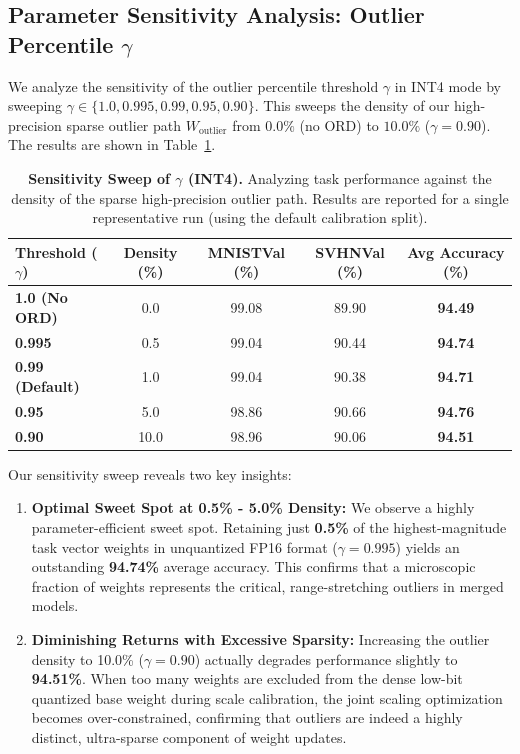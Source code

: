 \subsection{Parameter Sensitivity Analysis: Outlier Percentile $\gamma$}
We analyze the sensitivity of the outlier percentile threshold $\gamma$ in INT4 mode by sweeping $\gamma \in \{1.0, 0.995, 0.99, 0.95, 0.90\}$. This sweeps the density of our high-precision sparse outlier path $W_{\text{outlier}}$ from $0.0\%$ (no ORD) to $10.0\%$ ($\gamma = 0.90$). The results are shown in Table~\ref{tab:sweep_results}.

\begin{table}[h]
\caption{\textbf{Sensitivity Sweep of $\gamma$ (INT4).} Analyzing task performance against the density of the sparse high-precision outlier path. Results are reported for a single representative run (using the default calibration split).}
\label{tab:sweep_results}
\vskip 0.15in
\begin{center}
\begin{small}
\begin{sc}
\begin{tabular}{lcccc}
\toprule
Threshold ($\gamma$) & Density (\%) & MNISTVal (\%) & SVHNVal (\%) & Avg Accuracy (\%) \\
\midrule
\textbf{1.0 (No ORD)} & 0.0 & 99.08 & 89.90 & \textbf{94.49} \\
\textbf{0.995} & 0.5 & 99.04 & 90.44 & \textbf{94.74} \\
\textbf{0.99 (Default)} & 1.0 & 99.04 & 90.38 & \textbf{94.71} \\
\textbf{0.95} & 5.0 & 98.86 & 90.66 & \textbf{94.76} \\
\textbf{0.90} & 10.0 & 98.96 & 90.06 & \textbf{94.51} \\
\bottomrule
\end{tabular}
\end{sc}
\end{small}
\end{center}
\vskip -0.1in
\end{table}

Our sensitivity sweep reveals two key insights:
\begin{enumerate}
    \item \textbf{Optimal Sweet Spot at 0.5\% - 5.0\% Density:} We observe a highly parameter-efficient sweet spot. Retaining just \textbf{0.5\%} of the highest-magnitude task vector weights in unquantized FP16 format ($\gamma = 0.995$) yields an outstanding \textbf{94.74\%} average accuracy. This confirms that a microscopic fraction of weights represents the critical, range-stretching outliers in merged models.
    \item \textbf{Diminishing Returns with Excessive Sparsity:} Increasing the outlier density to 10.0\% ($\gamma = 0.90$) actually degrades performance slightly to \textbf{94.51\%}. When too many weights are excluded from the dense low-bit quantized base weight during scale calibration, the joint scaling optimization becomes over-constrained, confirming that outliers are indeed a highly distinct, ultra-sparse component of weight updates.
\end{enumerate}

